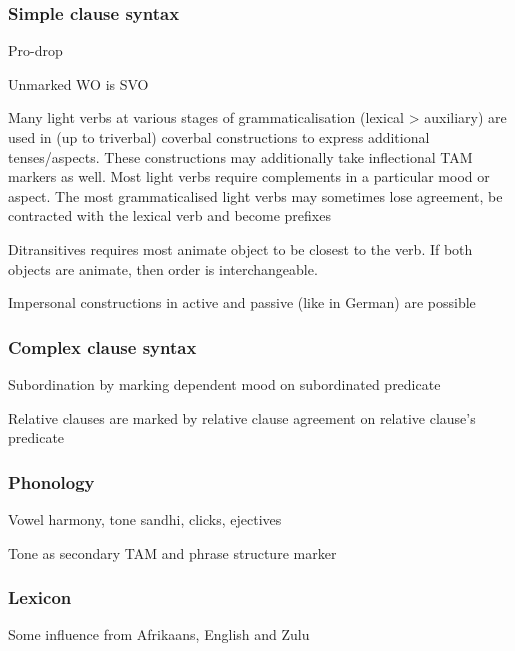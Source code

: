 \documentclass[a4paper, 11pt]{book}
\begin{document}
\subsubsection*{Simple clause syntax}
\begin{itemize*}
\item Pro-drop
\item Unmarked WO is SVO
\item Many light verbs at various stages of grammaticalisation (lexical > auxiliary) are used in (up to triverbal) coverbal constructions to express additional tenses/aspects. These constructions may additionally take inflectional TAM markers as well. Most light verbs require complements in a particular mood or aspect. The most grammaticalised light verbs may sometimes lose agreement, be contracted with the lexical verb and become prefixes
\item Ditransitives requires most animate object to be closest to the verb. If both objects are animate, then order is interchangeable.
\item Impersonal constructions in active and passive (like in German) are possible
\end{itemize*}


\subsubsection*{Complex clause syntax}
\begin{itemize*}
\item Subordination by marking dependent mood on subordinated predicate
\item Relative clauses are marked by relative clause agreement on relative clause's predicate
\end{itemize*}


\subsubsection*{Phonology}
\begin{itemize*}
\item Vowel harmony, tone sandhi, clicks, ejectives
\item Tone as secondary TAM and phrase structure marker
\end{itemize*}


\subsubsection*{Lexicon}
\begin{itemize*}
\item Some influence from Afrikaans, English and Zulu
\end{itemize*}
\end{document}
